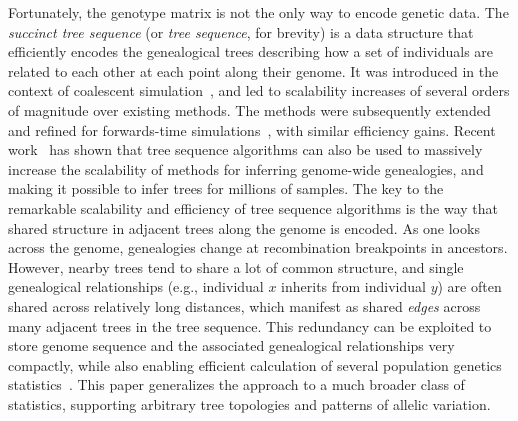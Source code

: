 \documentclass{article}
\begin{document}
Fortunately, the genotype matrix is not the only way to encode genetic data.
The \emph{succinct tree sequence} (or \emph{tree sequence}, for brevity) is a data
structure that efficiently encodes the genealogical trees describing how a set of
individuals are related to each other at each point along their genome.
It was introduced in the context of coalescent
simulation~\citep{kelleher2016efficient}, and led to scalability increases of
several orders of magnitude over existing methods. The methods were subsequently extended
and refined for forwards-time
simulations~\citep{kelleher2018efficient,haller2018tree}, with similar efficiency gains.
Recent work~\citep{kelleher2019inferring} has shown that tree sequence algorithms can
also be used to massively increase the scalability of methods for inferring
genome-wide genealogies, and making it possible to infer trees for millions of
samples.
The key to the remarkable scalability and efficiency of tree sequence
algorithms is the way that shared structure in adjacent trees along the genome is encoded.
As one looks across the genome, genealogies change at recombination breakpoints in ancestors.
However, nearby trees tend to share a lot of common structure,
and single genealogical relationships (e.g., individual $x$ inherits from individual $y$)
are often shared across relatively long distances,
which manifest as shared \emph{edges} across many adjacent trees in the tree sequence.
This redundancy can be exploited to store genome sequence and the
associated genealogical relationships very compactly, while also
enabling efficient calculation of several population genetics
statistics~\citep{kelleher2016efficient}.
This paper generalizes the approach to a much broader class of statistics,
supporting arbitrary tree topologies and patterns of allelic variation.
\end{document}
